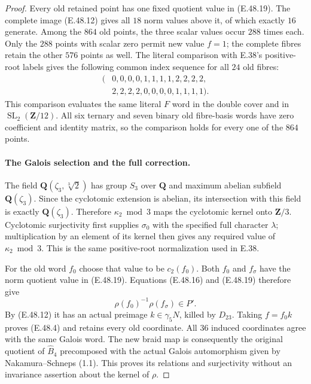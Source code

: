 \begin{proof}
Every old retained point has one fixed quotient value in
\textup{(E.48.19)}.
The complete image \textup{(E.48.12)} gives all $18$ norm
values above it, of which exactly $16$ generate.
Among the $864$ old points, the three scalar values occur
$288$ times each.
Only the $288$ points with scalar zero permit new value $f=1$;
the complete fibres retain the other $576$ points as well.
The literal comparison with E.38's positive-root labels gives
the following common index sequence for all $24$ old fibres:
\[
 \begin{split}
 (&0,0,0,0,1,1,1,1,2,2,2,2,\\
  &2,2,2,2,0,0,0,0,1,1,1,1).
 \end{split}
 \tag{E.48.21}
\]
This comparison evaluates the same literal $F$ word in the
double cover and in $\operatorname{SL}_2(\mathbf Z/12)$.
All six ternary and seven binary old fibre-basis words have
zero coefficient and identity matrix, so the comparison
holds for every one of the $864$ points.

\paragraph{The Galois selection and the full correction.}
The field
$\mathbf Q(\zeta_3,\sqrt[3]{2})$ has group $S_3$ over
$\mathbf Q$ and maximum abelian subfield
$\mathbf Q(\zeta_3)$.
Since the cyclotomic extension is abelian, its intersection
with this field is exactly $\mathbf Q(\zeta_3)$.
Therefore $\kappa_2\bmod3$ maps the cyclotomic kernel onto
$\mathbf Z/3$.
Cyclotomic surjectivity first supplies $\sigma_0$ with the
specified full character $\lambda$; multiplication by an
element of its kernel then gives any required value of
$\kappa_2\bmod3$.
This is the same positive-root normalization used in E.38.

For the old word $f_0$ choose that value to be $c_2(f_0)$.
Both $f_0$ and $f_\sigma$ have the norm quotient value in
\textup{(E.48.19)}.
Equations \textup{(E.48.16)} and \textup{(E.48.19)} therefore
give
\[
              \rho(f_0)^{-1}\rho(f_\sigma)\in P'.
 \tag{E.48.22}
\]
By \textup{(E.48.12)} it has an actual preimage
$k\in\gamma_5N$, killed by $D_{23}$.
Taking $f=f_0k$ proves \textup{(E.48.4)} and retains every
old coordinate.
All $36$ induced coordinates agree with the same Galois word.
The new braid map is consequently the original quotient of
$\widehat B_4$ precomposed with the actual Galois automorphism
given by Nakamura--Schneps (1.1).
This proves its relations and surjectivity without an
invariance assertion about the kernel of $\rho$.


\end{proof}
